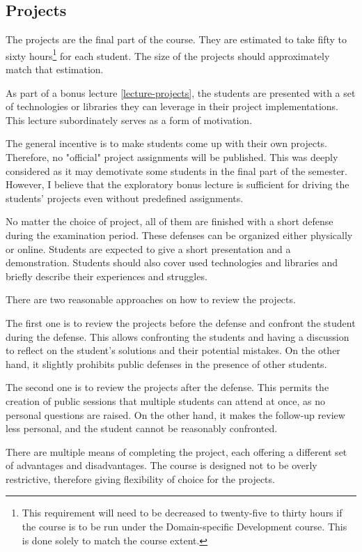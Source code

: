 \documentclass[
  digital,
  color,
  oneside,
  nosansbold,
  nocolorbold,
  lof,
  nolot,
]{fithesis4}
\begin{document}
\subsection{Projects}

The projects are the final part of the course. They are estimated to take fifty to sixty hours\footnote{This requirement will need to be decreased to twenty-five to thirty hours if the course is to be run under the Domain-specific Development course. This is done solely to match the course extent.} for each student. The size of the projects should approximately match that estimation.

As part of a bonus lecture \cref{lecture-projects}, the students are presented with a set of technologies or libraries they can leverage in their project implementations. This lecture subordinately serves as a form of motivation.

The general incentive is to make students come up with their own projects. Therefore, no "official" project assignments will be published. This was deeply considered as it may demotivate some students in the final part of the semester. However, I believe that the exploratory bonus lecture is sufficient for driving the students' projects even without predefined assignments.

No matter the choice of project, all of them are finished with a short defense during the examination period. These defenses can be organized either physically or online. Students are expected to give a short presentation and a demonstration. Students should also cover used technologies and libraries and briefly describe their experiences and struggles.

There are two reasonable approaches on how to review the projects. 

The first one is to review the projects before the defense and confront the student during the defense. This allows confronting the students and having a discussion to reflect on the student's solutions and their potential mistakes. On the other hand, it slightly prohibits public defenses in the presence of other students.

The second one is to review the projects after the defense. This permits the creation of public sessions that multiple students can attend at once, as no personal questions are raised. On the other hand, it makes the follow-up review less personal, and the student cannot be reasonably confronted.

There are multiple means of completing the project, each offering a different set of advantages and disadvantages. The course is designed not to be overly restrictive, therefore giving flexibility of choice for the projects.
\end{document}
